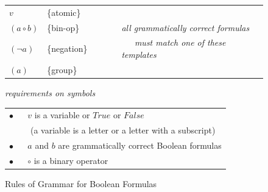 \begin{figure}
\begin{center}
\begin{tabular}{llll}
$v$             & \{atomic\}    &~~~~& \\
$(a \circ b)$   & \{bin-op\}    &~~~~& \emph{all grammatically correct formulas} \\
$(\neg a)$      & \{negation\}  &~~~~& \emph{~~~must match one of these templates}  \\
$(a)$           & \{group\}     &~~~~& \\
\end{tabular}

\vspace{2 mm}

\emph{requirements on symbols}

\begin{tabular}{l}
\hline
$\bullet$ ~~ $v$ is a variable or $True$ or $False$ \\
~~~~~(a variable is a letter or a letter with a subscript) \\
$\bullet$ ~~ $a$ and $b$ are grammatically correct Boolean formulas \\
$\bullet$ ~~ $\circ$ is a binary operator \\
\hline
\end{tabular}
\end{center}
\caption{Rules of Grammar for Boolean Formulas}
\label{fig-02-grammar}
\end{figure}

